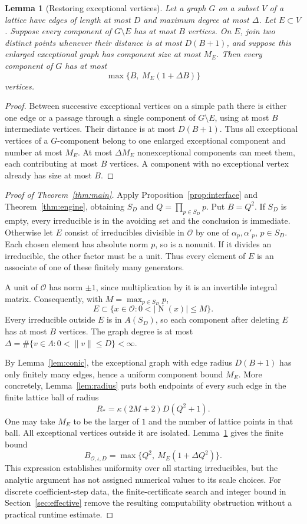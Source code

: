 \documentclass[11pt]{article}
\numberwithin{equation}{section}
\newtheorem{lemma}[theorem]{Lemma}
\theoremstyle{definition}\newtheorem{definition}[theorem]{Definition}
\theoremstyle{remark}\newtheorem{remark}[theorem]{Remark}
\newcommand{\OO}{\mathcal O}\newcommand{\PP}{\mathcal P}
\newcommand{\norm}[1]{\lVert #1\rVert}
\newcommand{\abs}[1]{\lvert #1\rvert}
\newcommand{\set}[1]{\{#1\}}
\newcommand{\N}{\operatorname{N}}
\begin{document}
\begin{lemma}[Restoring exceptional vertices]\label{lem:restoration}
Let a graph $G$ on a subset $V$ of a lattice have edges of length at most $D$ and maximum degree at most $\Delta$. Let $E\subset V$. Suppose every component of $G\setminus E$ has at most $B$ vertices. On $E$, join two distinct points whenever their distance is at most $D(B+1)$, and suppose this enlarged exceptional graph has component size at most $M_E$. Then every component of $G$ has at most
\[
 \max\{B,\ M_E(1+\Delta B)\}
\]
vertices.
\end{lemma}
\begin{proof}
Between successive exceptional vertices on a simple path there is either one edge or a passage through a single component of $G\setminus E$, using at most $B$ intermediate vertices. Their distance is at most $D(B+1)$. Thus all exceptional vertices of a $G$-component belong to one enlarged exceptional component and number at most $M_E$. At most $\Delta M_E$ nonexceptional components can meet them, each contributing at most $B$ vertices. A component with no exceptional vertex already has size at most $B$.
\end{proof}

\begin{proof}[Proof of Theorem~\ref{thm:main}]
Apply Proposition~\ref{prop:interface} and Theorem~\ref{thm:engine}, obtaining $S_D$ and $Q=\prod_{p\in S_D}p$. Put $B=Q^2$. If $S_D$ is empty, every irreducible is in the avoiding set and the conclusion is immediate. Otherwise let $E$ consist of irreducibles divisible in $\OO$ by one of $\alpha_p,\alpha'_p$, $p\in S_D$. Each chosen element has absolute norm $p$, so is a nonunit. If it divides an irreducible, the other factor must be a unit. Thus every element of $E$ is an associate of one of these finitely many generators.

A unit of $\OO$ has norm $\pm1$, since multiplication by it is an invertible integral matrix. Consequently, with $M=\max_{p\in S_D}p$,
\[
 E\subset\set{x\in\OO:0<\abs{\N(x)}\le M}.
\]
Every irreducible outside $E$ is in $A(S_D)$, so each component after deleting $E$ has at most $B$ vertices. The graph degree is at most
$\Delta=\#\set{v\in\Lambda:0<\norm v\le D}<\infty$.

By Lemma~\ref{lem:conic}, the exceptional graph with edge radius $D(B+1)$ has only finitely many edges, hence a uniform component bound $M_E$. More concretely, Lemma~\ref{lem:radius} puts both endpoints of every such edge in the finite lattice ball of radius
\[
 R_*=\kappa(2M+2)D(Q^2+1).
\]
One may take $M_E$ to be the larger of $1$ and the number of lattice points in that ball. All exceptional vertices outside it are isolated. Lemma~\ref{lem:restoration} gives the finite bound
\[
 B_{\OO,\iota,D}=\max\{Q^2,\ M_E(1+\Delta Q^2)\}.
\]
This expression establishes uniformity over all starting irreducibles, but the analytic argument has not assigned numerical values to its scale choices. For discrete coefficient-step data, the finite-certificate search and integer bound in Section~\ref{sec:effective} remove the resulting computability obstruction without a practical runtime estimate.
\end{proof}
\end{document}
